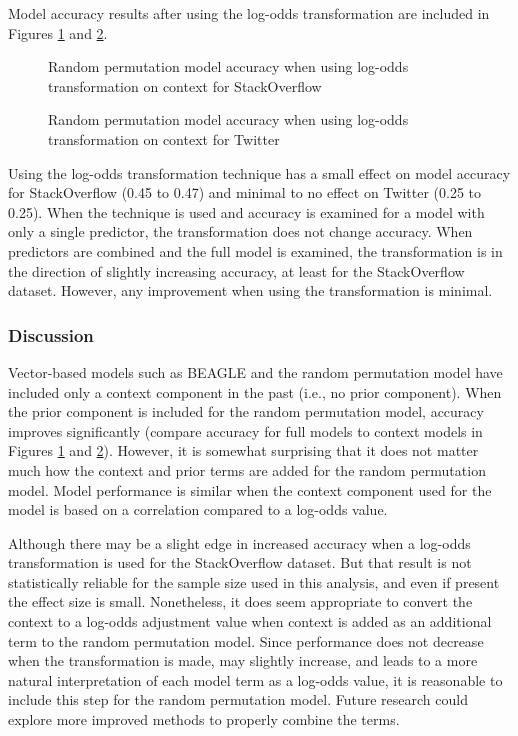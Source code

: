 \documentclass[man,floatsintext,donotrepeattitle]{apa6}
\begin{document}
Model accuracy results after using the log-odds transformation are included in Figures \ref{figContextLogoddsSO} and \ref{figContextLogoddsT}.

\begin{figure}[!htbp]
  \caption{Random permutation model accuracy when using log-odds transformation on context for StackOverflow}
  \label{figContextLogoddsSO}
\end{figure}

\begin{figure}[!htbp]
  \caption{Random permutation model accuracy when using log-odds transformation on context for Twitter}
  \label{figContextLogoddsT}
\end{figure}

Using the log-odds transformation technique has a small effect on model accuracy for StackOverflow (\num{.45} to \num{.47}) and minimal to no effect on Twitter (\num{.25} to \num{.25}).
When the technique is used and accuracy is examined for a model with only a single predictor, the transformation does not change accuracy.
When predictors are combined and the full model is examined, the transformation is in the direction of slightly increasing accuracy, at least for the StackOverflow dataset.
However, any improvement when using the transformation is minimal.

\subsubsection{Discussion}

Vector-based models such as BEAGLE \parencite{Jones2007} and the random permutation model \parencite{Sahlgren2008} have included only a context component in the past (i.e., no prior component).
When the prior component is included for the random permutation model, accuracy improves significantly (compare accuracy for full models to context models in Figures \ref{figContextLogoddsSO} and \ref{figContextLogoddsT}).
However, it is somewhat surprising that it does not matter much how the context and prior terms are added for the random permutation model.
Model performance is similar when the context component used for the model is based on a correlation compared to a log-odds value.

Although there may be a slight edge in increased accuracy when a log-odds transformation is used for the StackOverflow dataset.
But that result is not statistically reliable for the sample size used in this analysis, and even if present the effect size is small.
Nonetheless, it does seem appropriate to convert the context to a log-odds adjustment value when context is added as an additional term to the random permutation model.
Since performance does not decrease when the transformation is made, may slightly increase,
and leads to a more natural interpretation of each model term as a log-odds value, it is reasonable to include this step for the random permutation model.
Future research could explore more improved methods to properly combine the terms.
\end{document}
